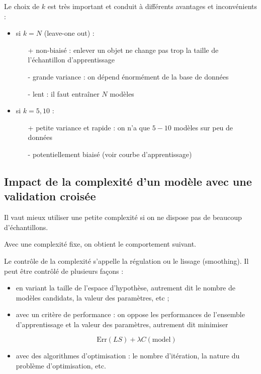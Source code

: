 	Le choix de $k$ est très important et conduit à différents avantages et inconvénients :
	
	\begin{itemize}
		\item si $k = N$ (leave-one out) :
		\begin{itemize}
			\item[+] non-biaisé : enlever un objet ne change pas trop la taille de l'échantillon d'apprentissage
			\item[-] grande variance : on dépend énormément de la base de données
			\item[-] lent : il faut entraîner $N$ modèles
		\end{itemize}
		\item si $k = 5, 10$ :
		
		\begin{itemize}
			\item[+] petite variance et rapide : on n'a que $5-10$ modèles sur peu de données
			\item[-] potentiellement biaisé (voir courbe d'apprentissage)
		\end{itemize}
	\end{itemize}
	
	
\subsection{Impact de la complexité d'un modèle avec une validation croisée}


	Il vaut mieux utiliser une petite complexité si on ne dispose pas de beaucoup d'échantillons.

	Avec une complexité fixe, on obtient le comportement suivant.


	Le contrôle de la complexité s'appelle la régulation ou le lissage (smoothing). Il peut être contrôlé de plusieurs façons :

	\begin{itemize}
		\item en variant la taille de l'espace d'hypothèse, autrement dit le nombre de modèles candidats, la valeur des paramètres, etc ;
		\item avec un critère de performance : on oppose les performances de l'ensemble d'apprentissage et la valeur des paramètres, autrement dit minimiser
	
		$$\text{Err}(LS) + \lambda C(\text{model})$$
	
		\item avec des algorithmes d'optimisation : le nombre d'itération, la nature du problème d'optimisation, etc.
	\end{itemize}

